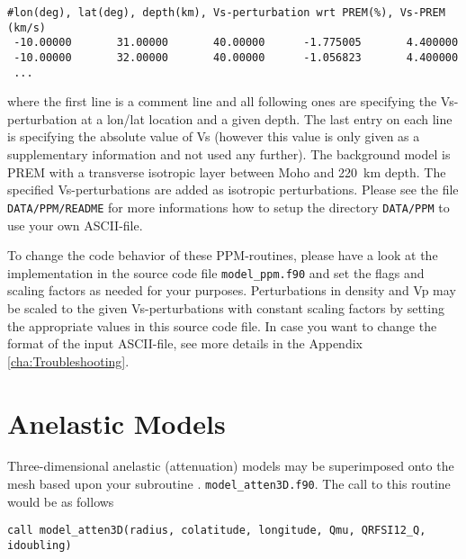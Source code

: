 {\footnotesize
\begin{verbatim}
#lon(deg), lat(deg), depth(km), Vs-perturbation wrt PREM(%), Vs-PREM (km/s)
 -10.00000       31.00000       40.00000      -1.775005       4.400000
 -10.00000       32.00000       40.00000      -1.056823       4.400000
 ...
\end{verbatim}
}
\noindent
where the first line is a comment line and all following ones are specifying the Vs-perturbation at a lon/lat location and a given depth.
The last entry on each line is specifying the absolute value of Vs (however this value is only given as a supplementary information
and not used any further). The background model is PREM with a transverse isotropic layer between Moho and 220~km depth.
The specified Vs-perturbations are added as isotropic perturbations. Please see the file \texttt{DATA/PPM/README}
for more informations how to setup the directory \texttt{DATA/PPM} to use your own ASCII-file.



To change the code behavior of these PPM-routines, please have a look at the implementation in the source code
file \texttt{model\_ppm.f90} and set the flags and scaling factors as needed for your purposes.
Perturbations in density and Vp may be scaled to the given Vs-perturbations with constant scaling factors by setting the appropriate
values in this source code file. In case you want to change the format of the input ASCII-file, see more details in the Appendix \ref{cha:Troubleshooting}.




\section{Anelastic Models}\label{sec:Anelastic-Models}

Three-dimensional anelastic (attenuation) models may be superimposed
onto the mesh based upon your subroutine .
\texttt{model\_atten3D.f90}.
The call to this routine would be as follows
\begin{verbatim}
call model_atten3D(radius, colatitude, longitude, Qmu, QRFSI12_Q, idoubling)
\end{verbatim}

